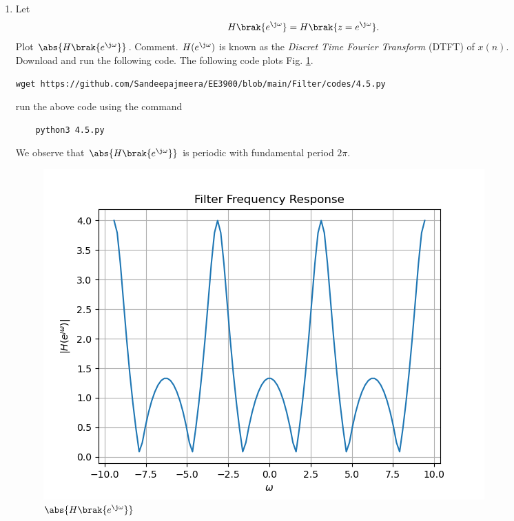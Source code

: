 \documentclass[journal,12pt,twocolumn]{IEEEtran}
\renewcommand\thesection{\arabic{section}}
\begin{document}
\begin{enumerate}[label=\thesection.\arabic*
,ref=\thesection.\theenumi]
\begin{equation}
\label{eq:anun}
a^nu(n) \ztrans \frac{1}{1-az^{-1}} \quad \abs{z} > \abs{a}
\end{equation}
\solution \begin{align}
	a^nu(n) &\ztrans \sum_{n=0}^\infty (az^{-1})^n\\
	& =\frac{1}{1-az^{-1}} \quad \abs{z} > \abs{a}
\end{align}
%
\item 
Let
\begin{equation}
H\brak{e^{\j \omega}} = H\brak{z = e^{\j \omega}}.
\end{equation}
Plot $\abs{H\brak{e^{\j \omega}}}$.  Comment.  $H(e^{\j \omega})$ is
known as the {\em Discret Time Fourier Transform} (DTFT) of $x(n)$.
\\
\solution Download and run the following code. The following code plots Fig. \ref{fig:dtft}.
\begin{lstlisting}
wget https://github.com/Sandeepajmeera/EE3900/blob/main/Filter/codes/4.5.py
\end{lstlisting}
run the above code using the command 
\begin{lstlisting}
	python3 4.5.py
\end{lstlisting}
We observe that $\abs{H\brak{e^{\j \omega}}}$ is periodic with fundamental period $2\pi$.
\begin{figure}[!ht]
\centering
\includegraphics[width=\columnwidth]{./figs/4.5.png}
\caption{$\abs{H\brak{e^{\j\omega}}}$}
\label{fig:dtft}
\end{figure}


\end{enumerate}
\end{document}
